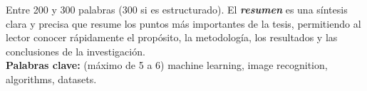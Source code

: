 Entre 200 y 300 palabras (300 si es estructurado). El
\textbf{\textit{resumen}} es una síntesis clara y precisa que resume
los puntos más importantes de la tesis, permitiendo al lector conocer
rápidamente el propósito, la metodología, los resultados y las
conclusiones de la investigación.\\


\textbf{Palabras clave:} (máximo de 5 a 6) machine learning, image
recognition, algorithms, datasets.
